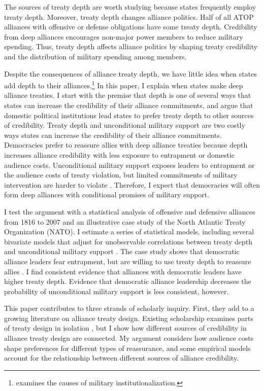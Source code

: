 \documentclass[12pt]{article}
\begin{document}
 
The sources of treaty depth are worth studying because states frequently employ treaty depth.
Moreover, treaty depth changes alliance politics. 
Half of all ATOP alliances with offensive or defense obligations have some treaty depth.
Credibility from deep alliances encourages non-major power members to reduce military spending.  
Thus, treaty depth affects alliance politics by shaping treaty credibility and the distribution of military spending among members. 


Despite the consequences of alliance treaty depth, we have little idea when states add depth to their alliances.\footnote{\citet{Mattes2012} examines the causes of military institutionalization.}
In this paper, I explain when states make deep alliance treaties.
I start with the premise that depth is one of several ways that states can increase the credibility of their alliance commitments, and argue that domestic political institutions lead states to prefer treaty depth to other sources of credibility.  
Treaty depth and unconditional military support are two costly ways states can increase the credibility of their alliance commitments.
Democracies prefer to reassure allies with deep alliance treaties because depth increases alliance credibility with less exposure to entrapment or domestic audience costs. 
Unconditional military support exposes leaders to entrapment or the audience costs of treaty violation, but limited commitments of military intervention are harder to violate \citep{Mattes2012, Chibaetal2015}.
Therefore, I expect that democracies will often form deep alliances with conditional promises of military support. 


I test the argument with a statistical analysis of offensive and defensive alliances from 1816 to 2007 and an illustrative case study of the North Atlantic Treaty Organization (NATO).
I estimate a series of statistical models, including several bivariate models that adjust for unobservable correlations between treaty depth and unconditional military support \citep{Braumoelleretal2018}. 
The case study shows that democratic alliance leaders fear entrapment, but are willing to use treaty depth to reassure allies \citep{SeawrightGerring2008, Seawright2016}. 
I find consistent evidence that alliances with democratic leaders have higher treaty depth.
Evidence that democratic alliance leadership decreases the probability of unconditional military support is less consistent, however. 


This paper contributes to three strands of scholarly inquiry.
First, they add to a growing literature on alliance treaty design.  
Existing scholarship examines parts of treaty design in isolation \citep{Benson2012, Mattes2012, Chibaetal2015}, but I show how different sources of credibility in alliance treaty design are connected. 
My argument considers how audience costs shape preferences for different types of reassurance, and some empirical models account for the relationship between different sources of alliance credibility. 
\end{document}
